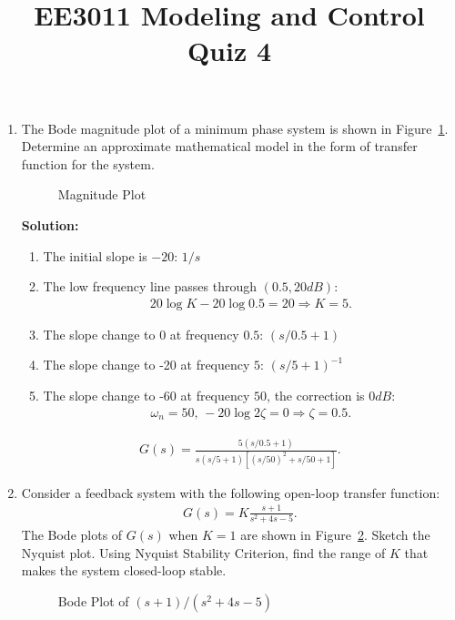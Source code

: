 \documentclass{article}
\title{EE3011 Modeling and Control\\Quiz 4}
\date{}
\newlength\figureheight
\newlength\figurewidth
\newcommand{\tikzdir}[1]{tikz/#1.tikz}
\newcommand{\inputtikz}[1]{}}
\begin{document}
 \maketitle

\begin{enumerate}
\item The Bode magnitude plot of a minimum phase system is shown in Figure~\ref{fig:1}. Determine an approximate mathematical model in the form of transfer function for the system.
  \begin{figure}[ht]
    \setlength\figureheight{8cm}
    \setlength\figurewidth{14cm}
    \centering
    \inputtikz{Quiz21}
    \caption{Magnitude Plot\label{fig:1}}
  \end{figure}

  {\bf Solution:}
  \begin{enumerate}
  \item The initial slope is $-20$: $1/s$
  \item The low frequency line passes through $(0.5,20dB)$:
    \begin{align*}
      20\log K - 20 \log 0.5 = 20\Rightarrow K = 5.
    \end{align*}
  \item The slope change to 0 at frequency $0.5$: $(s/0.5+1)$
  \item The slope change to -20 at frequency $5$: $(s/5+1)^{-1}$
  \item The slope change to -60 at frequency $50$, the correction is $0dB$:
    \begin{align*}
      \omega_n = 50,\,-20\log 2\zeta = 0 \Rightarrow \zeta = 0.5.
    \end{align*}
  \end{enumerate}
\begin{align*}
  G(s) = \frac{5(s/0.5+1)}{s(s/5+1)\left[(s/50)^2+s/50+1\right]}.
\end{align*}

  \newpage
\item Consider a feedback system with the following open-loop transfer function:
  \begin{align*}
    G(s) = K\frac{s+1}{s^2+4s-5}.
  \end{align*}
  The Bode plots of $G(s)$ when $K = 1$ are shown in Figure~\ref{fig:2}. Sketch the Nyquist plot. Using Nyquist Stability Criterion, find the range of $K$ that makes the system closed-loop stable.
  \begin{figure}[ht]
    \setlength\figureheight{5cm}
    \setlength\figurewidth{14cm}
    \centering
    \inputtikz{Quiz22}
    \caption{Bode Plot of $(s+1)/(s^2+4s-5)$\label{fig:2}}
  \end{figure}


\end{enumerate}
\end{document}
